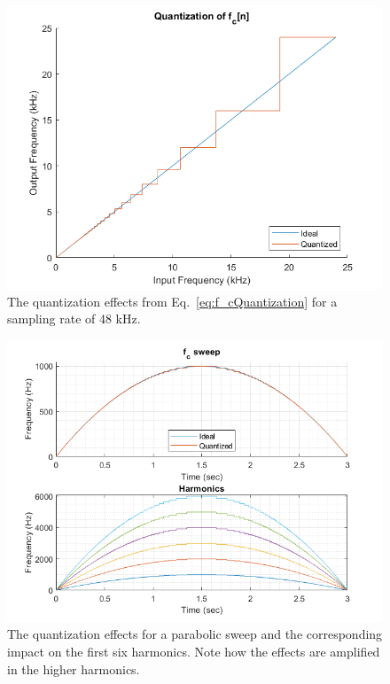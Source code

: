 \documentclass[../main.tex]{subfiles}
\begin{document}
\begin{figure}[h]
    \centering
    \includegraphics[scale=.65]{./images/plots/f_cQuantization.png}
    \caption{The quantization effects from Eq.~\ref{eq:f_cQuantization} for a sampling rate of 48 kHz.}
    \label{fig:f_cQuantized}
\end{figure}

\begin{figure}[h!]
    \centering
    \includegraphics[scale=.65]{./images/plots/f_cSweepQuantized.png}
    \caption{The quantization effects for a parabolic sweep and the corresponding impact on the first six harmonics. Note how the effects are amplified in the higher harmonics.}
    \label{fig:f_cSweepQuantized}
\end{figure}
\end{document}
